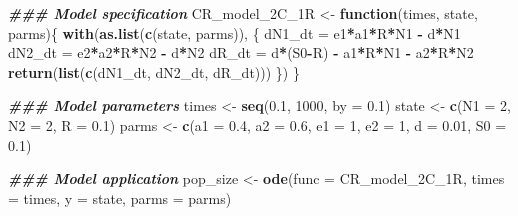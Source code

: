 \documentclass[
]{book}
\newenvironment{Shaded}{\begin{snugshade}}{\end{snugshade}}
\newcommand{\AttributeTok}[1]{\textcolor[rgb]{0.13,0.29,0.53}{#1}}
\newcommand{\ControlFlowTok}[1]{\textcolor[rgb]{0.13,0.29,0.53}{\textbf{#1}}}
\newcommand{\DecValTok}[1]{\textcolor[rgb]{0.00,0.00,0.81}{#1}}
\newcommand{\DocumentationTok}[1]{\textcolor[rgb]{0.56,0.35,0.01}{\textbf{\textit{#1}}}}
\newcommand{\FloatTok}[1]{\textcolor[rgb]{0.00,0.00,0.81}{#1}}
\newcommand{\FunctionTok}[1]{\textcolor[rgb]{0.13,0.29,0.53}{\textbf{#1}}}
\newcommand{\NormalTok}[1]{#1}
\newcommand{\OtherTok}[1]{\textcolor[rgb]{0.56,0.35,0.01}{#1}}
\newcommand{\SpecialCharTok}[1]{\textcolor[rgb]{0.81,0.36,0.00}{\textbf{#1}}}
\begin{document}
\begin{Shaded}
\begin{Highlighting}[]
\DocumentationTok{\#\#\# Model specification}
\NormalTok{CR\_model\_2C\_1R }\OtherTok{\textless{}{-}} \ControlFlowTok{function}\NormalTok{(times, state, parms)\{}
  \FunctionTok{with}\NormalTok{(}\FunctionTok{as.list}\NormalTok{(}\FunctionTok{c}\NormalTok{(state, parms)), \{}
\NormalTok{    dN1\_dt }\OtherTok{=}\NormalTok{ e1}\SpecialCharTok{*}\NormalTok{a1}\SpecialCharTok{*}\NormalTok{R}\SpecialCharTok{*}\NormalTok{N1 }\SpecialCharTok{{-}}\NormalTok{ d}\SpecialCharTok{*}\NormalTok{N1}
\NormalTok{    dN2\_dt }\OtherTok{=}\NormalTok{ e2}\SpecialCharTok{*}\NormalTok{a2}\SpecialCharTok{*}\NormalTok{R}\SpecialCharTok{*}\NormalTok{N2 }\SpecialCharTok{{-}}\NormalTok{ d}\SpecialCharTok{*}\NormalTok{N2}
\NormalTok{    dR\_dt }\OtherTok{=}\NormalTok{  d}\SpecialCharTok{*}\NormalTok{(S0}\SpecialCharTok{{-}}\NormalTok{R) }\SpecialCharTok{{-}}\NormalTok{ a1}\SpecialCharTok{*}\NormalTok{R}\SpecialCharTok{*}\NormalTok{N1 }\SpecialCharTok{{-}}\NormalTok{ a2}\SpecialCharTok{*}\NormalTok{R}\SpecialCharTok{*}\NormalTok{N2}
    \FunctionTok{return}\NormalTok{(}\FunctionTok{list}\NormalTok{(}\FunctionTok{c}\NormalTok{(dN1\_dt, dN2\_dt, dR\_dt)))}
\NormalTok{  \})}
\NormalTok{\}}

\DocumentationTok{\#\#\# Model parameters}
\NormalTok{times }\OtherTok{\textless{}{-}} \FunctionTok{seq}\NormalTok{(}\FloatTok{0.1}\NormalTok{, }\DecValTok{1000}\NormalTok{, }\AttributeTok{by =} \FloatTok{0.1}\NormalTok{)  }
\NormalTok{state }\OtherTok{\textless{}{-}} \FunctionTok{c}\NormalTok{(}\AttributeTok{N1 =} \DecValTok{2}\NormalTok{, }\AttributeTok{N2 =} \DecValTok{2}\NormalTok{, }\AttributeTok{R =} \FloatTok{0.1}\NormalTok{)  }
\NormalTok{parms }\OtherTok{\textless{}{-}} \FunctionTok{c}\NormalTok{(}\AttributeTok{a1 =} \FloatTok{0.4}\NormalTok{, }\AttributeTok{a2 =} \FloatTok{0.6}\NormalTok{, }\AttributeTok{e1 =} \DecValTok{1}\NormalTok{, }\AttributeTok{e2 =} \DecValTok{1}\NormalTok{, }\AttributeTok{d =} \FloatTok{0.01}\NormalTok{, }\AttributeTok{S0 =} \FloatTok{0.1}\NormalTok{)}

\DocumentationTok{\#\#\# Model application}
\NormalTok{pop\_size }\OtherTok{\textless{}{-}} \FunctionTok{ode}\NormalTok{(}\AttributeTok{func =}\NormalTok{ CR\_model\_2C\_1R, }\AttributeTok{times =}\NormalTok{ times, }\AttributeTok{y =}\NormalTok{ state, }\AttributeTok{parms =}\NormalTok{ parms)}


\end{Highlighting}
\end{Shaded}
\end{document}

